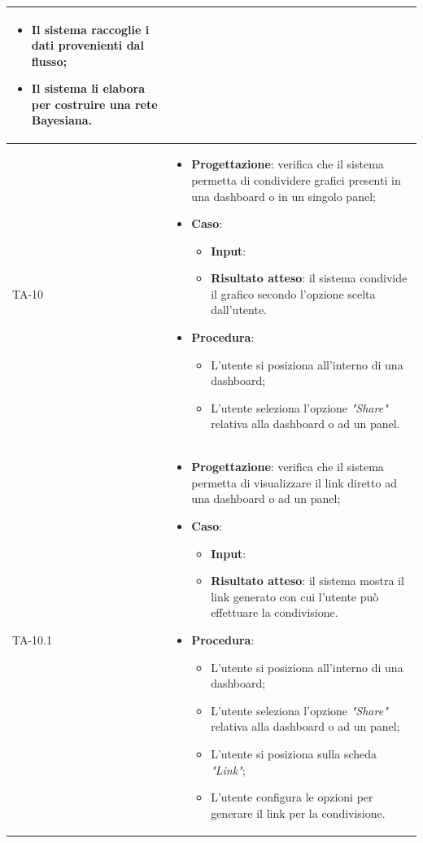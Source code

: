 \begin{longtable}{|C{2.5cm}|C{13cm}|}
\begin{itemize}
\begin{itemize}
		\item Il sistema raccoglie i dati provenienti dal flusso;
		\item Il sistema li elabora per costruire una rete Bayesiana.
	\end{itemize} 
\end{itemize} \\
\hline
{TA-10} &
\begin{itemize}
	\item \textbf{Progettazione}: verifica che il sistema permetta di condividere grafici presenti in una dashboard o in un singolo panel;
	\item \textbf{Caso}: 
	\begin{itemize}
		\item \textbf{Input}: 
		\item \textbf{Risultato atteso}: il sistema condivide il grafico secondo l'opzione scelta dall'utente.
	\end{itemize}
	\item \textbf{Procedura}:
	\begin{itemize}
		\item L'utente si posiziona all'interno di una dashboard;
		\item L'utente seleziona l'opzione \emph{"Share"} relativa alla dashboard o ad un panel.
	\end{itemize} 
\end{itemize}\\
\hline
{TA-10.1} &
\begin{itemize}
	\item \textbf{Progettazione}: verifica che il sistema permetta di visualizzare il link diretto ad una dashboard o ad un
	panel;
	\item \textbf{Caso}: 
	\begin{itemize}
		\item \textbf{Input}: 
		\item \textbf{Risultato atteso}: il sistema mostra il link generato con cui l'utente può effettuare la condivisione.
	\end{itemize}
	\item \textbf{Procedura}:
	\begin{itemize}
		\item L'utente si posiziona all'interno di una dashboard;
		\item L'utente seleziona l'opzione \emph{"Share"} relativa alla dashboard o ad un panel;
		\item L'utente si posiziona sulla scheda \emph{"Link"};
		\item L'utente configura le opzioni per generare il link per la condivisione.

\end{itemize}
\end{itemize}
\end{longtable}
